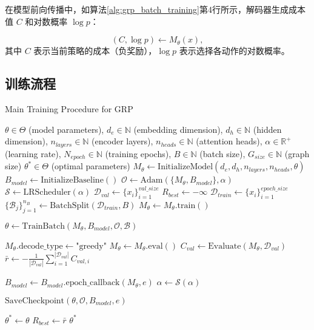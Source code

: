 \documentclass[AutoFakeBold]{LZUThesis}
\begin{document}
在模型前向传播中，如算法\ref{alg:grp_batch_training}第4行所示，解码器生成成本值 $C$ 和对数概率 $\log p$：

\begin{equation}
	(C, \log p) \leftarrow M_{\theta}(x),
\end{equation}
其中 $C$ 表示当前策略的成本（负奖励），$\log p$ 表示选择各动作的对数概率。

\subsection{训练流程}
\begin{algorithm}[H]
	\begin{algorithmic}[1]
		\caption{Main Training Procedure for GRP}
		\label{alg:grp_main_training}
		\Require $\theta \in \Theta$ (model parameters), $d_e \in \mathbb{N}$ (embedding dimension), $d_h \in \mathbb{N}$ (hidden dimension), $n_{layers} \in \mathbb{N}$ (encoder layers), $n_{heads} \in \mathbb{N}$ (attention heads), $\alpha \in \mathbb{R}^{+}$ (learning rate), $N_{epoch} \in \mathbb{N}$ (training epochs), $B \in \mathbb{N}$ (batch size), $G_{size} \in \mathbb{N}$ (graph size)
		\Ensure $\theta^* \in \Theta$ (optimal parameters)
		\State $M_{\theta} \leftarrow \text{InitializeModel}(d_e, d_h, n_{layers}, n_{heads}, \theta)$
		\State $B_{model} \leftarrow \text{InitializeBaseline}()$
		\State $\mathcal{O} \leftarrow \text{Adam}(\{M_{\theta}, B_{model}\}, \alpha)$
		\State $\mathcal{S} \leftarrow \text{LRScheduler}(\alpha)$
		\State $\mathcal{D}_{val} \leftarrow \{x_i\}_{i=1}^{val\_size}$ 
		\State $R_{best} \leftarrow -\infty$ 
		\State $\mathcal{D}_{train} \leftarrow \{x_i\}_{i=1}^{epoch\_size}$ 
		\State $\{\mathcal{B}_j\}_{j=1}^{n_B} \leftarrow \text{BatchSplit}(\mathcal{D}_{train}, B)$
		\State $M_{\theta} \leftarrow M_{\theta}.\text{train}()$ 

		\State $\theta \leftarrow \text{TrainBatch}(M_{\theta}, B_{model}, \mathcal{O}, \mathcal{B})$ 
		\EndFor

		\State $M_{\theta}.\text{decode\_type} \leftarrow \text{"greedy"}$
		\State $M_{\theta} \leftarrow M_{\theta}.\text{eval}()$
		\State $C_{val} \leftarrow \text{Evaluate}(M_{\theta}, \mathcal{D}_{val})$
		\State $\bar{r} \leftarrow -\frac{1}{|\mathcal{D}_{val}|}\sum_{i=1}^{|\mathcal{D}_{val}|} C_{val,i}$ 

		\State $B_{model} \leftarrow B_{model}.\text{epoch\_callback}(M_{\theta}, e)$
		\State $\alpha \leftarrow \mathcal{S}(\alpha)$ 

		\State $\text{SaveCheckpoint}(\theta, \mathcal{O}, B_{model}, e)$
		\EndIf

		\State $\theta^* \leftarrow \theta$ 
		\State $R_{best} \leftarrow \bar{r}$
		\EndIf
		\EndFor
		\State \Return $\theta^*$
	\end{algorithmic}
\end{algorithm}
\end{document}

